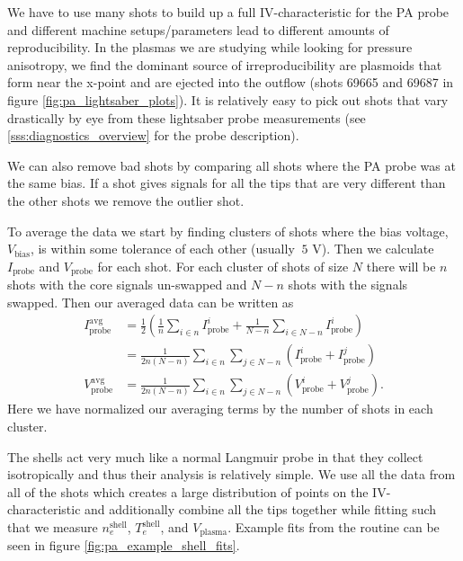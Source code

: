 We have to use many shots to build up a full IV-characteristic for the PA probe and different machine setups/parameters lead to different amounts of reproducibility. In the plasmas we are studying while looking for pressure anisotropy, we find the dominant source of irreproducibility are plasmoids that form near the x-point and are ejected into the outflow (shots 69665 and 69687 in figure \ref{fig:pa_lightsaber_plots}). It is relatively easy to pick out shots that vary drastically by eye from these lightsaber probe measurements (see \ref{sss:diagnostics_overview} for the probe description).

We can also remove bad shots by comparing all shots where the PA probe was at the same bias. If a shot gives signals for all the tips that are very different than the other shots we remove the outlier shot.


To average the data we start by finding clusters of shots where the bias voltage, $V_{\text{bias}}$, is within some tolerance of each other (usually $~5$ V). Then we calculate $I_\text{probe}$ and $V_\text{probe}$ for each shot. For each cluster of shots of size $N$ there will be $n$ shots with the core signals un-swapped and $N - n$ shots with the signals swapped. Then our averaged data can be written as
\begin{align*}
  I_\text{probe}^\text{avg} &= \frac{1}{2} \left( \frac{1}{n} \sum_{i \in n} I_\text{probe}^i + \frac{1}{N - n} \sum_{i \in N - n} I_\text{probe}^i \right) \\
  &= \frac{1}{2 n (N - n)} \sum_{i \in n} \sum_{j \in N - n} \left( I_\text{probe}^i + I_\text{probe}^j \right) \\
  V_\text{probe}^\text{avg} &= \frac{1}{2 n (N - n)} \sum_{i \in n} \sum_{j \in N - n} \left( V_\text{probe}^i + V_\text{probe}^j \right).
\end{align*}
Here we have normalized our averaging terms by the number of shots in each cluster.


The shells act very much like a normal Langmuir probe in that they collect isotropically and thus their analysis is relatively simple. We use all the data from all of the shots which creates a large distribution of points on the IV-characteristic and additionally combine all the tips together while fitting such that we measure $n_e^\text{shell}$, $T_e^\text{shell}$, and $V_\text{plasma}$. Example fits from the routine can be seen in figure \ref{fig:pa_example_shell_fits}.

